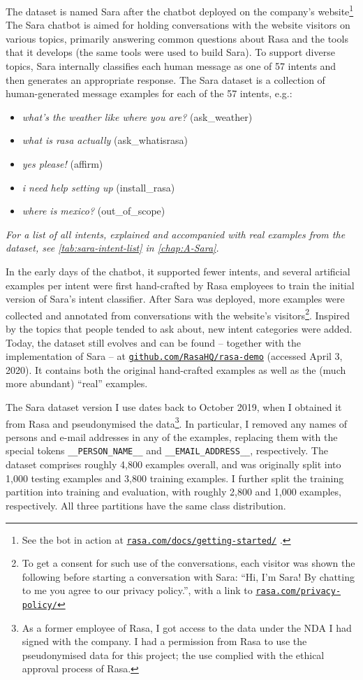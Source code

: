 \documentclass[bsc,frontabs,twoside,singlespacing,parskip,deptreport]{infthesis}
\newcommand\rurl[1]{%
  \href{https://#1}{\nolinkurl{#1}}%
}
\begin{document}
{{{      The dataset is named Sara after the chatbot deployed on the company's website\footnote{See the bot in action at \rurl{rasa.com/docs/getting-started/}.}
      The Sara chatbot is aimed for holding conversations with the website visitors on various topics, primarily answering common questions about Rasa and the tools that it develops (the same tools were used to build Sara).
      To support diverse topics, Sara internally classifies each human message as one of 57 intents and then generates an appropriate response. The Sara dataset is a collection of human-generated message examples for each of the 57 intents, e.g.:
      \begin{itemize}
        \item \textit{what's the weather like where you are?} (ask\_weather)
        \item \textit{what is rasa actually} (ask\_whatisrasa)
        \item \textit{yes please!} (affirm)
        \item \textit{i need help setting up} (install\_rasa)
        \item \textit{where is mexico?} (out\_of\_scope)
      \end{itemize}
      \textit{For a list of all intents, explained and accompanied with real examples from the dataset, see \autoref{tab:sara-intent-list} in \autoref{chap:A-Sara}.}

      In the early days of the chatbot, it supported fewer intents, and several artificial examples per intent were first hand-crafted by Rasa employees to train the initial version of Sara's intent classifier. After Sara was deployed, more examples were collected and annotated from conversations with the website's visitors\footnote{To get a consent for such use of the conversations, each visitor was shown the following before starting a conversation with Sara: ``Hi, I'm Sara! By chatting to me you agree to our privacy policy.'', with a link to \rurl{rasa.com/privacy-policy/}}. Inspired by the topics that people tended to ask about, new intent categories were added. Today, the dataset still evolves and can be found -- together with the implementation of Sara -- at \rurl{github.com/RasaHQ/rasa-demo} (accessed April 3, 2020). It contains both the original hand-crafted examples as well as the (much more abundant) ``real'' examples.

      The Sara dataset version I use dates back to October 2019, when I obtained it from Rasa and pseudonymised the data\footnote{As a former employee of Rasa, I got access to the data under the NDA I had signed with the company. I had a permission from Rasa to use the pseudonymised data for this project; the use complied with the ethical approval process of Rasa.}. In particular, I removed any names of persons and e-mail addresses in any of the examples, replacing them with the special tokens \verb|__PERSON_NAME__| and \verb|__EMAIL_ADDRESS__|, respectively.      
      The dataset comprises roughly 4,800 examples overall, and was originally split into 1,000 testing examples and 3,800 training examples. 
      I further split the training partition into training and evaluation, with roughly 2,800 and 1,000 examples, respectively. All three partitions have the same class distribution.

}}}
\end{document}
